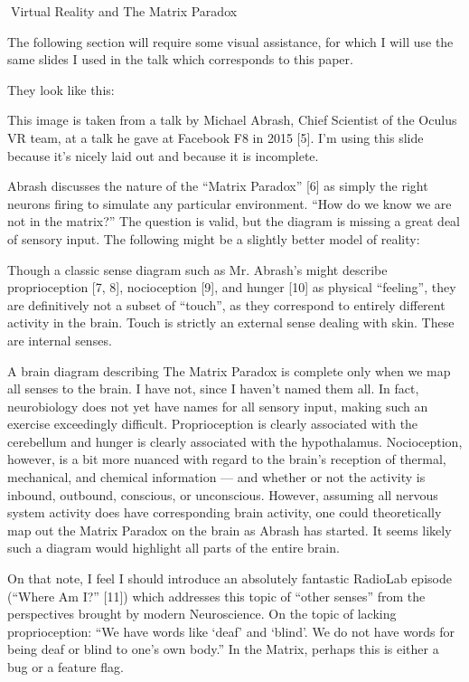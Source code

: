\documentclass{article}
\begin{document}
Virtual Reality
and
The Matrix Paradox


The following section will require some visual assistance, for which I will use the same slides I used in the talk which corresponds to this paper.

They look like this:

This image is taken from a talk by Michael Abrash, Chief Scientist of the Oculus VR team, at a talk he gave at Facebook F8 in 2015 [5]. I'm using this slide because it's nicely laid out and because it is incomplete.

Abrash discusses the nature of the ``Matrix Paradox'' [6] as simply the right neurons firing to simulate any particular environment. ``How do we know we are not in the matrix?'' The question is valid, but the diagram is missing a great deal of sensory input. The following might be a slightly better model of reality:

Though a classic sense diagram such as Mr. Abrash’s might describe proprioception [7, 8], nocioception [9], and hunger [10] as physical ``feeling'', they are definitively not a subset of ``touch'', as they correspond to entirely different activity in the brain. Touch is strictly an external sense dealing with skin. These are internal senses.

A brain diagram describing The Matrix Paradox is complete only when we map all senses to the brain. I have not, since I haven't named them all. In fact, neurobiology does not yet have names for all sensory input, making such an exercise exceedingly difficult. Proprioception is clearly associated with the cerebellum and hunger is clearly associated with the hypothalamus. Nocioception, however, is a bit more nuanced with regard to the brain's reception of thermal, mechanical, and chemical information — and whether or not the activity is inbound, outbound, conscious, or unconscious. However, assuming all nervous system activity does have corresponding brain activity, one could theoretically map out the Matrix Paradox on the brain as Abrash has started. It seems likely such a diagram would highlight all parts of the entire brain.

On that note, I feel I should introduce an absolutely fantastic RadioLab episode (``Where Am I?'' [11]) which addresses this topic of ``other senses'' from the perspectives brought by modern Neuroscience. On the topic of lacking proprioception: “We have words like ‘deaf’ and ‘blind’. We do not have words for being deaf or blind to one’s own body.” In the Matrix, perhaps this is either a bug or a feature flag.
\end{document}
